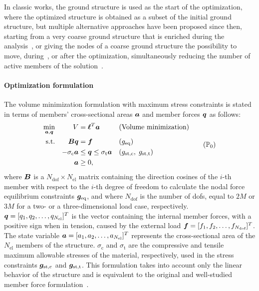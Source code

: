 In classic works, the ground structure is used as the start of the optimization, where the optimized structure is obtained as a subset of the initial ground structure, but multiple alternative approaches have been proposed since then, \eg starting from a very coarse ground structure that is enriched during the analysis~, or giving the nodes of a coarse ground structure the possibility to move, during~, or after the optimization, simultaneously reducing the number of active members of the solution~.

\paragraph{Optimization formulation}
The volume minimization formulation with maximum stress constraints is stated in terms of members' cross-sectional areas $\bm{a}$ and member forces $\bm{q}$ as follows:
\begin{equation}
    \begin{aligned}
    \min_{\vect{a}, \vect{q}}   && V &= \vect{\ell}^{T}\vect{a} && \textrm{(Volume minimization)}\\
    \textrm{s.t.}   && \matr{B}\vect{q} &= \vect{f} && (g_\text{eq})\\
    && -\sigma_\text{c}\vect{a} &\leq \vect{q} \leq \sigma_\text{t}\vect{a} && (g_\text{st,c}, \; g_\text{st,t}) \\
    && \vect{a} &\geq 0, \\
    \end{aligned}
    \tag{$\mathbb{P}_0$}
    \label{eq:02_optim_original}
\end{equation}
where $\bm{B}$ is a $N_{\text{dof}} \times N_{\text{el}}$ matrix containing the direction cosines of the $i$-th member with respect to the $i$-th degree of freedom to calculate the nodal force equilibrium constraints $\bm{g}_\text{eq}$, and where $N_{\text{dof}}$ is the number of \gls{dofs}, equal to $2M$ or $3M$ for a two- or a three-dimensional load case, respectively. $\bm{q} = [q_1, q_2, \ldots,q_{N_{\text{el}}}]^T$ is the vector containing the internal member forces, with a positive sign when in tension, caused by the external load $\bm{f} = [f_1, f_2, \ldots,f_{N_{\text{dof}}}]^T$. The state variable $\bm{a} = [a_1, a_2, \ldots,a_{N_{\text{el}}}]^T$ represents the cross-sectional area of the $N_{\text{el}}$ members of the structure. $\sigma_\text{c}$ and $\sigma_\text{t}$ are the compressive and tensile maximum allowable stresses of the material, respectively, used in the stress constraints $\bm{g}_\text{st,c}$ and $\bm{g}_\text{st,t}$. This formulation takes into account only the linear behavior of the structure and is equivalent to the original and well-studied member force formulation~.

